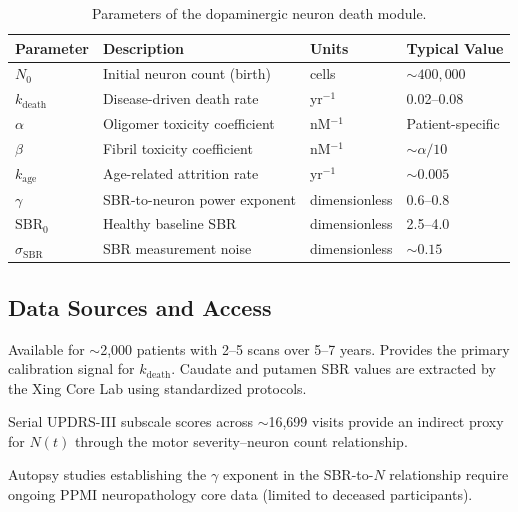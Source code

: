 \begin{table}[h]
\centering
\caption{Parameters of the dopaminergic neuron death module.}
\label{tab:neuron-params}
\small
\begin{tabular}{llll}
\toprule
\textbf{Parameter} & \textbf{Description} & \textbf{Units} & \textbf{Typical Value} \\
\midrule
$N_0$ & Initial neuron count (birth) & cells & $\sim 400{,}000$ \\
$k_\text{death}$ & Disease-driven death rate & yr$^{-1}$ & 0.02--0.08 \\
$\alpha$ & Oligomer toxicity coefficient & nM$^{-1}$ & Patient-specific \\
$\beta$ & Fibril toxicity coefficient & nM$^{-1}$ & $\sim \alpha / 10$ \\
$k_\text{age}$ & Age-related attrition rate & yr$^{-1}$ & $\sim 0.005$ \\
$\gamma$ & SBR-to-neuron power exponent & dimensionless & 0.6--0.8 \\
$\text{SBR}_0$ & Healthy baseline SBR & dimensionless & 2.5--4.0 \\
$\sigma_\text{SBR}$ & SBR measurement noise & dimensionless & $\sim 0.15$ \\
\bottomrule
\end{tabular}
\end{table}

\subsection{Data Sources and Access}

\begin{description}[style=nextline]
\item[Serial DaT-SPECT (PPMI)] Available for $\sim$2,000 patients with 2--5 scans over 5--7 years. Provides the primary calibration signal for $k_\text{death}$. Caudate and putamen SBR values are extracted by the Xing Core Lab using standardized protocols.

\item[PPMI UPDRS Trajectories] Serial UPDRS-III subscale scores across $\sim$16,699 visits provide an indirect proxy for $N(t)$ through the motor severity--neuron count relationship.

\item[Post-mortem Correlations] Autopsy studies establishing the $\gamma$ exponent in the SBR-to-$N$ relationship require ongoing PPMI neuropathology core data (limited to deceased participants).
\end{description}

